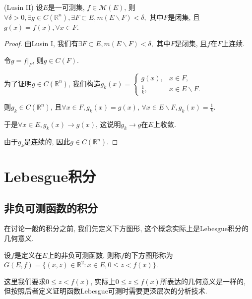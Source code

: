 \documentclass[theorem=false,mathfont=none,openany,sub3section]{easybook}
\begin{document}
\begin{theorem}
  (Lusin II) 设$E$是一可测集, $f\in \mathcal{M} (E)$, 则$\forall \delta >0, \exists g\in C(\mathbb{R}^n), \exists F\subset E, m(E\backslash F)<\delta,$ 其中$F$是闭集, 且$g(x)=f(x),\forall x \in F$.\par
\end{theorem}

\begin{proof}
  由Lusin I, 我们有$\exists F\subset E, m(E\backslash F)<\delta,$ 其中$F$是闭集, 且$f$在$F$上连续.\par
  令$g=\left.f\right|_{F}$, 则$g\in C(F)$.\par
  为了证明$g\in C(\mathbb{R}^n)$, 我们构造$g_k(x)=\left\{\begin{array}{ll}
    g(x), & x\in F, \\
    \frac{1}{k}, & x\in E\backslash F.
  \end{array}\right.$\par
  则$g_k\in C(\mathbb{R}^n)$, 且$\forall x\in F, g_k(x)=g(x)$, $\forall x\in E\backslash F, g_k(x)=\frac{1}{k}$.\par
  于是$\forall x\in E, g_k(x)\rightarrow g(x)$, 这说明$g_k\rightarrow g$在$E$上收敛.\par
  由于$g_k$是连续的, 因此$g\in C(\mathbb{R}^n)$.\par
\end{proof}
\newpage

\chapter{Lebesgue积分}

\section{非负可测函数的积分}

在讨论一般的积分之前, 我们先定义下方图形, 这个概念实际上是Lebesgue积分的几何意义.\par

\begin{definition}
  设$f$是定义在$E$上的非负可测函数, 则称$f$的下方图形称为$G(E,f)=\{(x,z)\in \mathbb{R}^2: x\in E, 0\leqslant z< f(x)\}$.\par
\end{definition}

\begin{remark}
  这里我们要求$0\leqslant z< f(x)$, 实际上$0\leqslant z\leqslant f(x)$所表达的几何意义是一样的, 但按照后者定义证明函数Lebesgue可测时需要更深层次的分析技术.\par
\end{remark}
\end{document}
